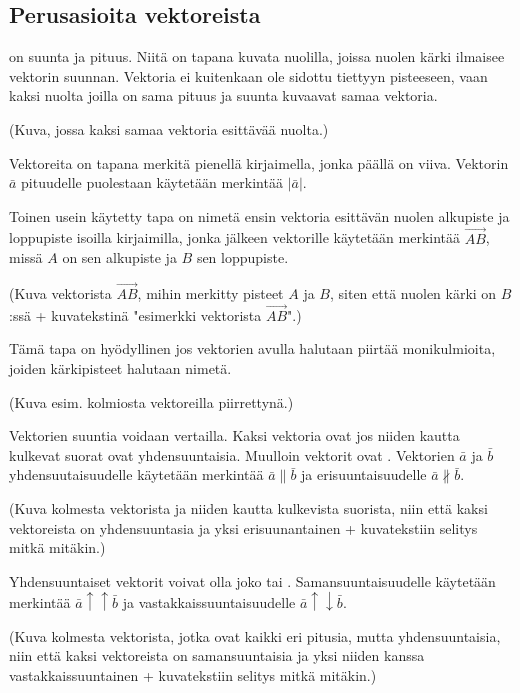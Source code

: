 \subsection*{Perusasioita vektoreista}

 on suunta ja pituus. Niitä on tapana kuvata nuolilla, joissa nuolen kärki ilmaisee vektorin suunnan. Vektoria ei kuitenkaan ole sidottu tiettyyn pisteeseen, vaan kaksi nuolta joilla on sama pituus ja suunta kuvaavat samaa vektoria.

(Kuva, jossa kaksi samaa vektoria esittävää nuolta.)

Vektoreita on tapana merkitä pienellä kirjaimella, jonka päällä on viiva. Vektorin $\bar{a}$ pituudelle puolestaan käytetään merkintää $|\bar{a}|$.

Toinen usein käytetty tapa on nimetä ensin vektoria esittävän nuolen alkupiste ja loppupiste isoilla kirjaimilla, jonka jälkeen vektorille käytetään merkintää $\overrightarrow{AB}$, missä $A$ on sen alkupiste ja $B$ sen loppupiste. 

(Kuva vektorista $\overrightarrow{AB}$, mihin merkitty pisteet $A$ ja $B$, siten että nuolen kärki on $B$:ssä + kuvatekstinä "esimerkki vektorista $\overrightarrow{AB}$".) 

Tämä tapa on hyödyllinen jos vektorien avulla halutaan piirtää monikulmioita, joiden kärkipisteet halutaan nimetä.

(Kuva esim. kolmiosta vektoreilla piirrettynä.)

Vektorien suuntia voidaan vertailla. Kaksi vektoria ovat  jos niiden kautta kulkevat suorat ovat yhdensuuntaisia. Muulloin vektorit ovat . Vektorien $\bar{a}$ ja $\bar{b}$ yhdensuutaisuudelle käytetään merkintää $\bar{a} \parallel \bar{b}$ ja erisuuntaisuudelle $\bar{a} \nparallel \bar{b}$.

(Kuva kolmesta vektorista ja niiden kautta kulkevista suorista, niin että kaksi vektoreista on yhdensuuntasia ja yksi erisuunantainen + kuvatekstiin selitys mitkä mitäkin.)

Yhdensuuntaiset vektorit voivat olla joko  tai . Samansuuntaisuudelle käytetään merkintää $\bar{a} \uparrow \uparrow  \bar{b}$ ja vastakkaissuuntaisuudelle $\bar{a} \uparrow \downarrow \bar{b}$.

(Kuva kolmesta vektorista, jotka ovat kaikki eri pitusia, mutta yhdensuuntaisia, niin että kaksi vektoreista on samansuuntaisia ja yksi niiden kanssa vastakkaissuuntainen + kuvatekstiin selitys mitkä mitäkin.)

